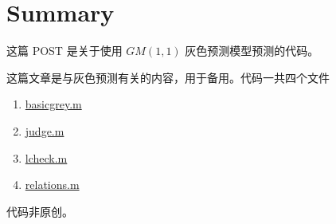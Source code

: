 \section{Summary}
这篇 POST 是关于使用 $GM(1,1)$ 灰色预测模型预测的代码。

这篇文章是与灰色预测有关的内容，用于备用。代码一共四个文件
\begin{enumerate}
    \item \href{/r/source/matlab/basicgrey.m}{basicgrey.m}
    \item \href{/r/source/matlab/judge.m}{judge.m}
    \item \href{/r/source/matlab/lcheck.m}{lcheck.m}
    \item \href{/r/source/matlab/relations.m}{relations.m}
\end{enumerate}
代码非原创。